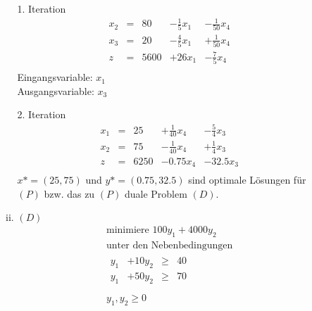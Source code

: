\documentclass[a4paper]{scrartcl}
\begin{document}
\begin{enumerate}[label=\bfseries\arabic*.]
\begin{enumerate}
\begin{enumerate}[(i)]
                        1. Iteration
                        \begin{equation}
                            \begin{array}{rcrrr}
                                x_2 & = & 80 & -\frac{1}{5}x_1 & -\frac{1}{50}x_4 \\
                                x_3 & = & 20 & -\frac{4}{5}x_1 & +\frac{1}{50}x_4 \\
                                \hline
                                z & = & 5600 & +26x_1 & -\frac{7}{5}x_4 \\
                            \end{array}
                        \end{equation}
                        Eingangsvariable: $x_1$ \\
                        Ausgangsvariable: $x_3$

                        2. Iteration
                        \begin{equation}
                            \begin{array}{rcrrr}
                                x_1 & = & 25 & +\frac{1}{40}x_4 & -\frac{5}{4}x_3 \\
                                x_2 & = & 75 & -\frac{1}{40}x_4 & +\frac{1}{4}x_3 \\
                                \hline
                                z & = & 6250 & -0.75x_4 & -32.5x_3 \\
                            \end{array}
                        \end{equation}
                        $x* = \left( 25, 75 \right)$ und $y* = \left( 0.75, 32.5 \right)$
                        sind optimale Lösungen für $(P)$ bzw. das zu $(P)$ duale
                        Problem $(D)$.
                        

                    \item $(D)$
                        \begin{equation}
                            \begin{gathered}
                                \text{minimiere }
                                100y_1 +4000y_2 \\
                                \text{unter den Nebenbedingungen} \\
                                \begin{array}{rrcr}
                                    y_1 & +10y_2 & \geq & 40 \\
                                    y_1 & +50y_2 & \geq & 70 \\
                                \end{array} \\
                                y_1, y_2 \geq 0
                            \end{gathered}
                        \end{equation}


\end{enumerate}
\end{enumerate}
\end{enumerate}
\end{document}
